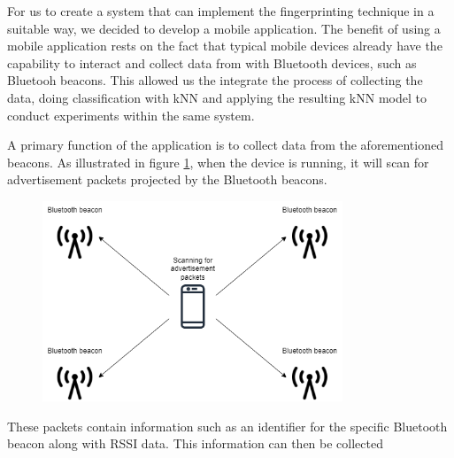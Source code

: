 For us to create a system that can implement the fingerprinting technique in a suitable way, we decided to develop a mobile application.
The benefit of using a mobile application rests on the fact that typical mobile devices already have the capability to interact and collect data from with Bluetooth devices, such as Bluetooh beacons.
This allowed us the integrate the process of collecting the data, doing classification with kNN and applying the resulting kNN model to conduct experiments within the same system.

A primary function of the application is to collect data from the aforementioned beacons. 
As illustrated in figure \ref{fig:ScanAdvertisement}, when the device is running, it will scan for advertisement packets projected by the Bluetooth beacons. 

\begin{figure}[H]
    \centering
    \includegraphics[width=0.8\textwidth]{images/ScanningForAdvertisement.drawio.png}
    \caption{}
    \label{fig:ScanAdvertisement}
\end{figure}

These packets contain information such as an identifier for the specific Bluetooth beacon along with RSSI data.
This information can then be collected 


% 


